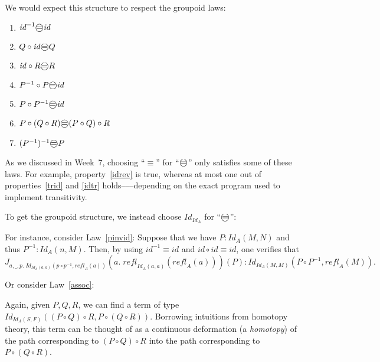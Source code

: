 \documentclass{article} \usepackage{chtt-notes} \usepackage{stmaryrd}
\newcommand{\circled}[1]{\text{\textcircled{#1}}}
\begin{document}
We would expect this structure to respect the groupoid laws:
\begin{enumerate}
    \item \label{idrev} $\mathit{id}^{-1} \circled{=} \mathit{id}$
    \item \label{trid} $Q \circ \mathit{id} \circled{=} Q$
    \item \label{idtr} $\mathit{id} \circ R \circled{=} R$
    \item $P^{-1} \circ P \circled{=} \mathit{id}$
    \item \label{pinvid} $P \circ P^{-1} \circled{=} \mathit{id}$
    \item \label{assoc} $P \circ (Q \circ R) \circled{=} (P \circ Q) \circ R$
    \item $(P^{-1})^{-1} \circled{=} P$
\end{enumerate}
As we discussed in Week~7, choosing ``$\equiv$'' for ``$\circled{=}$'' only satisfies some of these laws.
For example, property~\ref{idrev} is true, whereas at most one out of properties~\ref{trid} and \ref{idtr} holds–––depending on the exact program used to implement transitivity.

To get the groupoid structure, we instead choose $\mathit{Id}_{\mathit{Id}_A}$ for ``$\circled{=}$'':

For instance, consider Law~\ref{pinvid}:
Suppose that we have $P : \mathit{Id}_A(M, N)$ and thus $P^{-1} : \mathit{Id}_A(n, M)$.
Then, by using $\mathit{id}^{-1} \equiv \mathit{id}$ and $\mathit{id} \circ \mathit{id} \equiv \mathit{id}$, one verifies that
\[J_{a,\_,p.\; \mathit{Id}_{\mathit{Id}_A(a,a)}(p \circ p^{-1}, \mathit{refl}_A(a))}(a.\; \mathit{refl}_{\mathit{Id}_A(a,a)}(\mathit{refl}_A(a)))(P) : \mathit{Id}_{\mathit{Id}_A(M, M)}(P \circ P^{-1}, \mathit{refl}_A(M)).\]

Or consider Law~\ref{assoc}:
\begin{center}\end{center}
Again, given $P, Q, R$, we can find a term of type $\mathit{Id}_{\mathit{Id}_A(S, F)}((P \circ Q) \circ R, P \circ (Q \circ R))$.
Borrowing intuitions from homotopy theory, this term can be thought of as a continuous deformation (a \emph{homotopy}) of the path corresponding to $(P \circ Q) \circ R$ into the path corresponding to $P \circ (Q \circ R)$.
\end{document}
